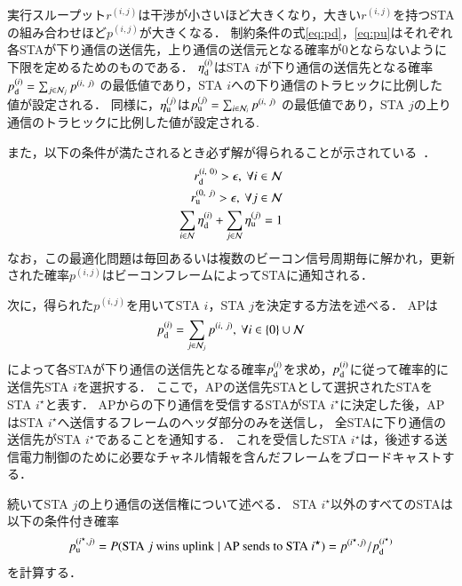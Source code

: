 \documentclass[master]{kuisthesis}		%
\newcommand{\sij}{(i,j)}
\newcommand{\mN}{{\mathcal N}}
\newcommand{\pij}{p^{(i,j)}}
\newcommand{\rij}{r^{\sij}}
\begin{document}
			実行スループット$\rij$は干渉が小さいほど大きくなり，大きい$\rij$を持つSTAの組み合わせほど$p^{\sij}$が大きくなる．
			制約条件の式\eqref{eq:pd}，\eqref{eq:pu}はそれぞれ各STAが下り通信の送信先，上り通信の送信元となる確率が0とならないように下限を定めるためのものである．
			$\eta_{\rm d}^{(i)}$はSTA $i$が下り通信の送信先となる確率$p_{\rm d}^{(i)}=\sum_{j\in{\mathcal N}_j} p^{(i,\ j)}$
			の最低値であり，STA $i$への下り通信のトラヒックに比例した値が設定される．
			同様に，$\eta_{\rm u}^{(j)}$は$p_{\rm u}^{(j)}=\sum_{i\in{\mathcal N}_i} p^{(i,\ j)}$
			の最低値であり，STA $j$の上り通信のトラヒックに比例した値が設定される.
			\par
			また，以下の条件が満たされるとき必ず解が得られることが示されている~\cite{promac}．
			\begin{align}
				r_{\rm d}^{(i,\ 0)} >\epsilon,\ \forall i\in\mN \\
				r_{\rm u}^{(0,\ j)} >\epsilon,\ \forall j\in\mN \\
				\sum_{i\in\mN}\eta_{\rm d}^{(i)} + \sum_{j\in\mN}\eta_{\rm u}^{(j)} =1 \label{eq:feasible}
			\end{align}
			なお，この最適化問題は毎回あるいは複数のビーコン信号周期毎に解かれ，更新された確率$\pij$はビーコンフレームによってSTAに通知される．
			\par
			次に，得られた$\pij$を用いてSTA $i$，STA $j$を決定する方法を述べる．
			APは
			\begin{equation}
				p_{\rm d}^{(i)}= \sum_{j\in{\mathcal N}_j}p^{(i,\ j)},\ \forall i \in \{0\}\cup{\mathcal N}
			\end{equation}
			によって各STAが下り通信の送信先となる確率$p_{\rm d}^{(i)}$を求め，$p_{\rm d}^{(i)}$に従って確率的に送信先STA $i$を選択する．
			ここで，APの送信先STAとして選択されたSTAをSTA $i^{\star}$と表す．
			APからの下り通信を受信するSTAがSTA $i^{\star}$に決定した後，APはSTA $i^{\star}$へ送信するフレームのヘッダ部分のみを送信し，
			全STAに下り通信の送信先がSTA $i^{\star}$であることを通知する．
			これを受信したSTA $i^{\star}$は，後述する送信電力制御のために必要なチャネル情報を含んだフレームをブロードキャストする．
			\par
			続いてSTA $j$の上り通信の送信権について述べる．
			STA $i^{\star}$以外のすべてのSTAは以下の条件付き確率
			\begin{equation}
				p_{\rm u}^{(i^{\star},j)} = P({\rm STA}\ j\ {\rm wins\ uplink}\mid{\rm AP\ sends\ to}\ {\rm STA}\ i^{\star})=p^{(i^{\star},j)} / p_{\rm d}^{(i^{\star})} \label{eq:win}
			\end{equation}
			を計算する．
\end{document}
